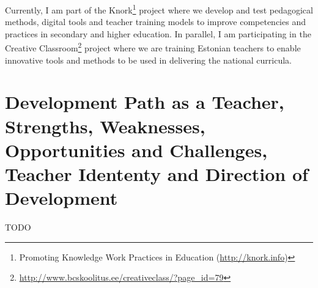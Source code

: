 Currently, I am part of the Knork\footnote{Promoting Knowledge Work Practices in Education (\url{http://knork.info})} project where we develop and test pedagogical methods, digital tools and teacher training models to improve competencies and practices in secondary and higher education. 
In parallel, I am participating in the Creative Classroom\footnote{\url{http://www.bcskoolitus.ee/creativeclass/?page_id=79}} project where we are training Estonian teachers  to enable innovative tools and methods to be used in delivering the national curricula.


\section{Development Path as a Teacher, Strengths, Weaknesses, Opportunities and Challenges, Teacher Idententy and Direction of Development}

TODO






  
  
  
  
  
  
  
  
  